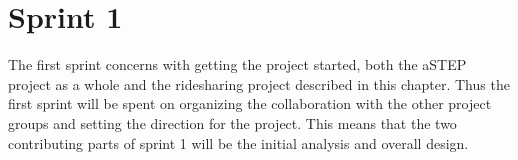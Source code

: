 \chapter{Sprint 1}
The first sprint concerns with getting the project started, both the aSTEP project as a whole and the ridesharing project described in this chapter.
Thus the first sprint will be spent on organizing the collaboration with the other project groups and setting the direction for the project.
This means that the two contributing parts of sprint 1 will be the initial analysis and overall design.


%
%